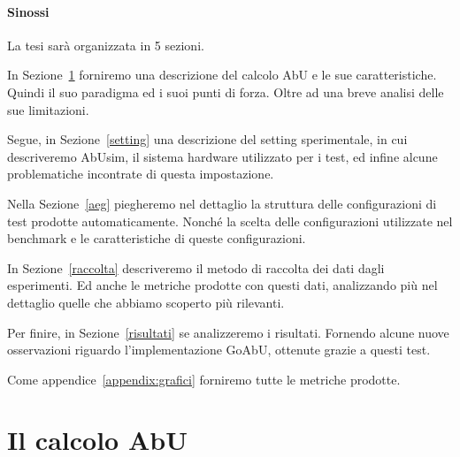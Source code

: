 \documentclass[12pt, a4paper]{article}
\begin{document}
\paragraph{Sinossi}

La tesi sarà organizzata in 5 sezioni.

In Sezione~\ref{sec:calculus} forniremo una descrizione del calcolo AbU e le sue caratteristiche. Quindi il suo paradigma ed i suoi punti di forza. Oltre ad una breve analisi delle sue limitazioni.

Segue, in Sezione~\ref{setting} una descrizione del setting sperimentale, in cui descriveremo AbUsim, il sistema hardware utilizzato per i test, ed infine alcune problematiche incontrate di questa impostazione.

Nella Sezione~\ref{aeg} piegheremo nel dettaglio la struttura delle configurazioni di test prodotte automaticamente. Nonché la scelta delle configurazioni utilizzate nel benchmark e le caratteristiche di queste configurazioni.

In Sezione~\ref{raccolta} descriveremo il metodo di raccolta dei dati dagli esperimenti. Ed anche le metriche prodotte con questi dati, analizzando più nel dettaglio quelle che abbiamo scoperto più rilevanti.

Per finire, in Sezione~\ref{risultati} se analizzeremo i risultati. Fornendo alcune nuove osservazioni riguardo l'implementazione GoAbU, ottenute grazie a questi test.

Come appendice~\ref{appendix:grafici} forniremo tutte le metriche prodotte.

\section{Il calcolo AbU}\label{sec:calculus}
\end{document}
